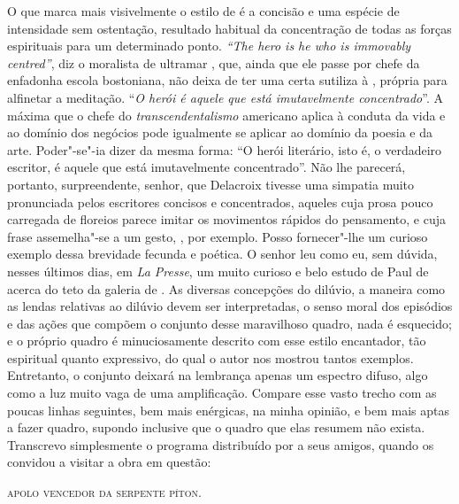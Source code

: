 O que marca mais visivelmente o estilo de  é a concisão e uma
espécie de intensidade sem ostentação, resultado habitual da
concentração de todas as forças espirituais para um determinado ponto.
\textit{“The hero is he who is immovably centred”}, diz o moralista de
ultramar , que, ainda que ele passe por chefe da enfadonha
escola bostoniana, não deixa de ter uma certa sutiliza à ,
própria para alfinetar a meditação. “\textit{O herói é aquele que está
imutavelmente concentrado}”. A máxima que o chefe do
\textit{transcendentalismo} americano aplica à conduta da vida e ao
domínio dos negócios pode igualmente se aplicar ao domínio da poesia e
da arte. Poder"-se"-ia dizer da mesma forma: “O herói literário, isto é,
o verdadeiro escritor, é aquele que está imutavelmente concentrado”.
Não lhe parecerá, portanto, surpreendente, senhor, que Delacroix
tivesse uma simpatia muito pronunciada pelos escritores concisos e
concentrados, aqueles cuja prosa pouco carregada de floreios parece
imitar os movimentos rápidos do pensamento, e cuja frase assemelha"-se a
um gesto, , por exemplo. Posso fornecer"-lhe um curioso
exemplo dessa brevidade fecunda e poética. O senhor leu como eu, sem
dúvida, nesses últimos dias, em \textit{La Presse}, um muito curioso e
belo estudo de Paul de  
acerca do teto da galeria de .
As diversas concepções do dilúvio, a maneira como as lendas relativas
ao dilúvio devem ser interpretadas, o senso moral dos episódios e das
ações que compõem o conjunto desse maravilhoso quadro, nada é
esquecido; e o próprio quadro é minuciosamente descrito com esse estilo
encantador, tão espiritual quanto expressivo, do qual o autor nos
mostrou tantos exemplos. Entretanto, o conjunto deixará na lembrança
apenas um espectro difuso, algo como a luz muito vaga de uma
amplificação. Compare esse vasto trecho com as poucas linhas seguintes,
bem mais enérgicas, na minha opinião, e bem mais aptas a fazer quadro,
supondo inclusive que o quadro que elas resumem não exista. Transcrevo
simplesmente o programa distribuído por  a seus amigos, quando
os convidou a visitar a obra em questão: 

\vspace{1em}
\textsc{apolo vencedor da serpente píton.}
\vspace{1em}

